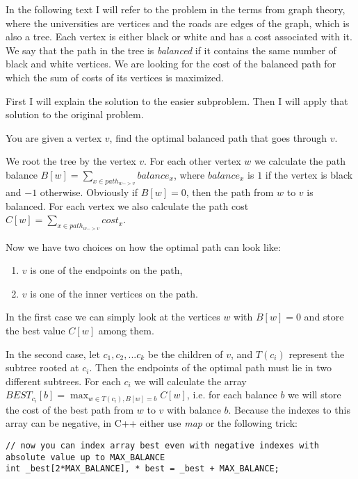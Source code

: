 

In the following text I will refer to the problem in the terms from graph theory,
where the universities are vertices and the roads are edges of the graph, which is also a
tree. Each vertex is either black or white and has a cost associated with it.
We say that the path in the tree is \emph{balanced} if
it contains the same number of black and white vertices.
We are looking for the cost of the balanced path for which the sum of costs
of its vertices is maximized.

First I will explain the solution to the easier subproblem. Then I will apply
that solution to the original problem.



You are given a vertex $v$, find the optimal balanced path that goes through $v$.

We root the tree by the vertex $v$. For each other vertex $w$ we calculate the path balance
$B[w] = \sum_{x \in path_{w->v}}balance_x$, where $balance_x$ is $1$ if the vertex is black and $-1$ otherwise.
Obviously if $B[w] = 0$, then the path from $w$ to $v$ is balanced.
For each vertex we also calculate the path cost
$C[w] = \sum_{x \in path_{w->v}}cost_x$.

Now we have two choices on how the optimal path can look like:
\begin{enumerate}
\item $v$ is one of the endpoints on the path,
\item $v$ is one of the inner vertices on the path.
\end{enumerate}

In the first case we can simply look at the vertices $w$ with $B[w] = 0$ and store
the best value $C[w]$ among them.

In the second case, let $c_1, c_2, ... c_k$ be the children of $v$, and $T(c_i)$
represent the subtree rooted at $c_i$. Then the endpoints of the optimal path
must lie in two different subtrees.
For each $c_i$ we will calculate the array $BEST_{c_i}[b] = \max_{w \in T(c_i), B[w] = b}C[w]$,
i.e. for each balance $b$ we will store the cost of the best path from $w$ to $v$ with balance $b$.
Because the indexes to this array can be negative, in C++ either use \emph{map} or
the following trick:
\begin{lstlisting}
// now you can index array best even with negative indexes with absolute value up to MAX_BALANCE
int _best[2*MAX_BALANCE], * best = _best + MAX_BALANCE;
\end{lstlisting}

